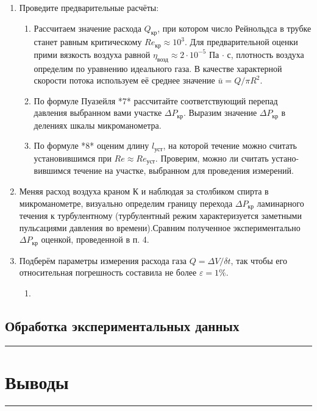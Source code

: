 \documentclass[a4paper,12pt]{article} %
\begin{document}
\begin{enumerate}
\item Проведите предварительные расчёты:
	\begin{enumerate}
	\item Рассчитаем значение расхода $Q_{\text{кр}}$, при котором число Рейнольдса в трубке станет равным критическому $Re_{\text{кр}} \approx 10^3$. Для предварительной оценки прими вязкость воздуха равной $\eta_\text{возд} \approx 2 \cdot 10^{-5}$ Па $\cdot$ с, плотность воздуха определим по уравнению идеального газа. В качестве характерной скорости  потока используем её  среднее  значение $\bar{u} = Q/ \pi R^2$.
	\item По формуле Пуазейля *7* рассчитайте соответствующий перепад давления выбранном вами участке $\Delta P_\text{кр}$. Выразим значение $\Delta P_\text{кр}$ в делениях шкалы микроманометра.
	\item По формуле *8* оценим длину $l_\text{уст}$, на которой течение можно считать установившимся при $Re \approx Re_\text{уст}$. Проверим, можно ли считать устано-вившимся течение на участке, выбранном для проведения измерений.
	\end{enumerate}
	
\item Меняя расход воздуха краном К и наблюдая за столбиком спирта в микроманометре, визуально определим границу перехода $\Delta P_\text{кр}$ ламинарного течения  к  турбулентному  (турбулентный  режим  характеризуется заметными пульсациями давления во времени).Сравним полученное экспериментально $\Delta P_\text{кр}$ оценкой, проведенной в п. 4.

\item Подберём параметры измерения расхода газа $Q = \Delta V / \delta t$, так	чтобы его относительная погрешность составила не более $\varepsilon = 1\%$.
	\begin{enumerate}
	\item
	\end{enumerate}

\end{enumerate}

\FloatBarrier

\subsection{Обработка экспериментальных данных}

\medskip\hrule\medskip

\section{Выводы}

\medskip\hrule\medskip
\end{document}
